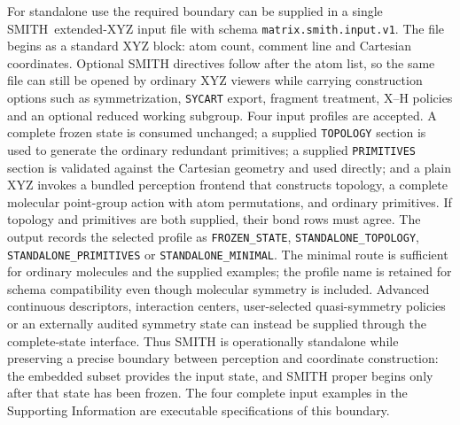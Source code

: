 \documentclass[journal=jctcce,manuscript=article,layout=traditional]{achemso}
\newcommand{\SMITH}{\textsc{SMITH}}
\theoremstyle{definition}
\begin{document}
For standalone use the required boundary can be supplied in a single
\SMITH\ extended-XYZ input file with schema \texttt{matrix.smith.input.v1}.  The file begins as a standard XYZ block: atom count, comment line and Cartesian
coordinates.  Optional SMITH directives follow after the atom list, so the same
file can still be opened by ordinary XYZ viewers while carrying construction
options such as symmetrization, \texttt{SYCART} export, fragment treatment,
X--H policies and an optional reduced working subgroup.  Four input profiles
are accepted.  A complete frozen state is consumed unchanged; a supplied
\texttt{TOPOLOGY} section is used to generate the ordinary redundant
primitives; a supplied \texttt{PRIMITIVES} section is validated against the
Cartesian geometry and used directly; and a plain XYZ invokes a bundled
perception frontend that constructs topology, a complete molecular point-group
action with atom permutations, and ordinary primitives.  If
topology and primitives are both supplied, their bond rows must agree.  The
output records the selected profile as \texttt{FROZEN\_STATE},
\texttt{STANDALONE\_TOPOLOGY}, \texttt{STANDALONE\_PRIMITIVES} or
\texttt{STANDALONE\_MINIMAL}.  The minimal route is sufficient for ordinary
molecules and the supplied examples; the profile name is retained for schema
compatibility even though molecular symmetry is included.  Advanced continuous
descriptors, interaction centers, user-selected quasi-symmetry policies or an
externally audited symmetry state can instead be supplied through the
complete-state interface.  Thus SMITH is operationally standalone while
preserving a precise boundary between perception and coordinate construction:
the embedded subset provides the input state, and SMITH proper begins only
after that state has been frozen.  The four complete input examples in the
Supporting Information are executable specifications of this boundary.
\end{document}
